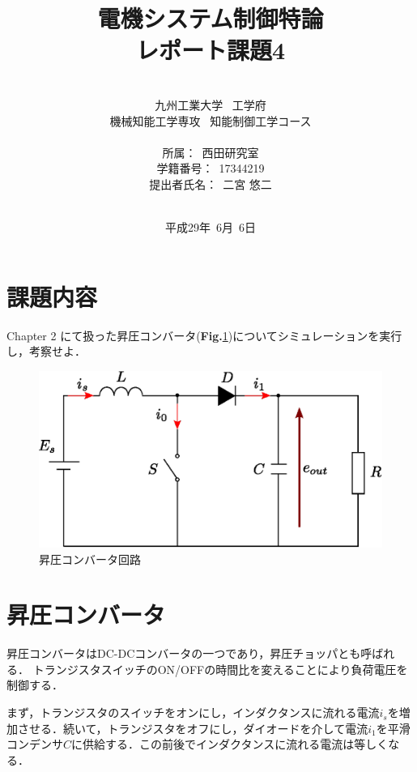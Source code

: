 \documentclass[a4paper,12pt]{jarticle}
\title{\Large{電機システム制御特論\\ レポート課題4\\}
}
\author{\vspace{70mm}\\
九州工業大学\ \hspace{0mm} 工学府\\
機械知能工学専攻\ \hspace{0mm} 知能制御工学コース\\
\\
所属：\ 西田研究室\\
学籍番号：\ 17344219\\
提出者氏名：\ 二宮 \hspace{0mm} 悠二\\\vspace{5mm}\\}
\date{平成29年\ 6月\ 6日}
\begin{document}
\titlepage
\maketitle
\thispagestyle{empty}
\newpage

\thispagestyle{empty}
\tableofcontents
\newpage

\section{課題内容}
Chapter 2 にて扱った昇圧コンバータ({\bf Fig.}{\ref{circuit}})についてシミュレーションを実行し，考察せよ．
%
\begin{figure}[b]
 \begin{center}
  \includegraphics[scale=0.9]{../figure/eps/circuit.eps}
  \caption{昇圧コンバータ回路}
  \label{circuit}
 \end{center}
\end{figure}
%
\section{昇圧コンバータ}
昇圧コンバータはDC-DCコンバータの一つであり，昇圧チョッパとも呼ばれる．
トランジスタスイッチのON/OFFの時間比を変えることにより負荷電圧を制御する\cite{1,2}．




まず，トランジスタのスイッチをオンにし，インダクタンスに流れる電流$ i_s $を増加させる．続いて，トランジスタをオフにし，ダイオードを介して電流$ i_1 $を平滑コンデンサ$ C $に供給する．この前後でインダクタンスに流れる電流は等しくなる．
\end{document}
